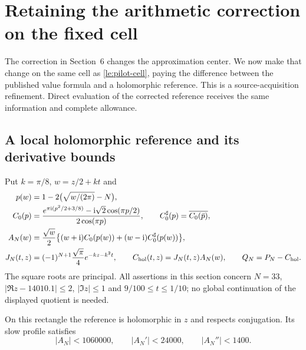 \section{Retaining the arithmetic correction on the fixed cell}
\label{sec:corrected-reference}

The correction in Section~6 changes the approximation center. We now
make that change on the same cell as \eqref{le:pilot-cell}, paying the
difference between the published value formula and a holomorphic reference.
This is a source-acquisition refinement. Direct evaluation of the corrected
reference receives the same information and complete allowance.

\subsection{A local holomorphic reference and its derivative bounds}

Put $k=\pi/8$, $w=z/2+kt$ and
\begin{align}
 p(w)&=1-2\bigl(\sqrt{w/(2\pi)}-N\bigr),\notag\\
 C_0(p)&=\frac{e^{\pi\mathrm i(p^2/2+3/8)}-\mathrm i\sqrt2\cos(\pi p/2)}
                   {2\cos(\pi p)},\qquad
 C_0^\sharp(p)=\overline{C_0(\bar p)},\notag\\
 A_N(w)&=\frac{\sqrt w}{2}
       \bigl\{(w+\mathrm i)C_0(p(w))+(w-\mathrm i)C_0^\sharp(p(w))\bigr\},\notag\\
 J_N(t,z)&=(-1)^{N+1}\frac{\sqrt\pi}{4}e^{-kz-k^2t},\qquad
 C_{\rm hol}(t,z)=J_N(t,z)A_N(w),\qquad Q_N=P_N-C_{\rm hol}.
 \label{cr:reference}
\end{align}
The square roots are principal. All assertions in this section concern
$N=33$, $|\Re z-14010.1|\le2$, $|\Im z|\le1$ and
$9/100\le t\le1/10$; no global continuation of the displayed quotient
is needed.

\begin{proposition}
\label{cr:bounds}
On this rectangle the reference is holomorphic in $z$ and respects
conjugation. Its slow profile satisfies
\begin{equation}
 |A_N|<1060000,\qquad |A_N'|<24000,\qquad |A_N''|<1400.
 \label{cr:profile-bounds}
\end{equation}
\end{proposition}

